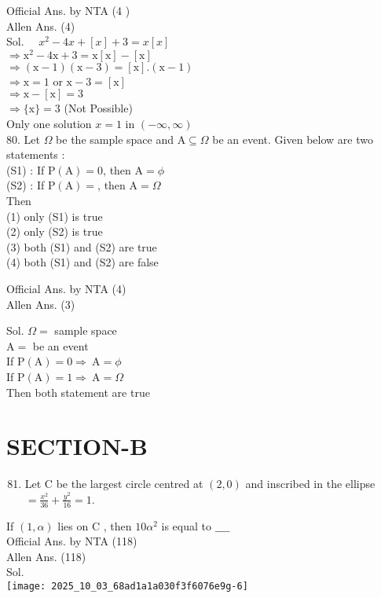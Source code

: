 \documentclass[10pt]{article}
\begin{document}
Official Ans. by NTA (4 )\\
Allen Ans. (4)\\
Sol. \(\quad x^{2}-4 x+[x]+3=x[x]\)\\
\(\Rightarrow \mathrm{x}^{2}-4 \mathrm{x}+3=\mathrm{x}[\mathrm{x}]-[\mathrm{x}]\)\\
\(\Rightarrow(\mathrm{x}-1)(\mathrm{x}-3)=[\mathrm{x}] .(\mathrm{x}-1)\)\\
\(\Rightarrow \mathrm{x}=1\) or \(\mathrm{x}-3=[\mathrm{x}]\)\\
\(\Rightarrow \mathrm{x}-[\mathrm{x}]=3\)\\
\(\Rightarrow\{\mathrm{x}\}=3\) (Not Possible)\\
Only one solution \(x=1\) in \((-\infty, \infty)\)\\
80. Let \(\Omega\) be the sample space and \(\mathrm{A} \subseteq \Omega\) be an event. Given below are two statements :\\
(S1) : If \(\mathrm{P}(\mathrm{A})=0\), then \(\mathrm{A}=\phi\)\\
(S2) : If \(\mathrm{P}(\mathrm{A})=\), then \(\mathrm{A}=\Omega\)\\
Then\\
(1) only (S1) is true\\
(2) only (S2) is true\\
(3) both (S1) and (S2) are true\\
(4) both (S1) and (S2) are false

Official Ans. by NTA (4)\\
Allen Ans. (3)

Sol. \(\Omega=\) sample space\\
\(\mathrm{A}=\) be an event\\
If \(\mathrm{P}(\mathrm{A})=0 \Rightarrow \mathrm{~A}=\phi\)\\
If \(\mathrm{P}(\mathrm{A})=1 \Rightarrow \mathrm{~A}=\Omega\)\\
Then both statement are true

\section*{SECTION-B}
\begin{enumerate}
  \setcounter{enumi}{80}
  \item Let C be the largest circle centred at \((2,0)\) and inscribed in the ellipse \(=\frac{x^{2}}{36}+\frac{y^{2}}{16}=1\).
\end{enumerate}

If \((1, \alpha)\) lies on C , then \(10 \alpha^{2}\) is equal to \(\_\_\_\_\)\\
Official Ans. by NTA (118)\\
Allen Ans. (118)\\
Sol.\\
\texttt{[image: 2025\_10\_03\_68ad1a1a030f3f6076e9g-6]}
\end{document}
